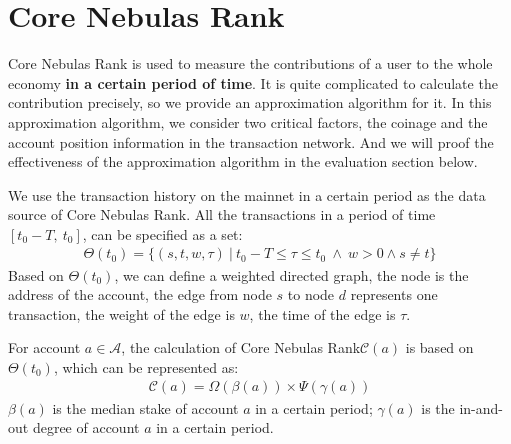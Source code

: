\section{Core Nebulas Rank}

Core Nebulas Rank is used to measure the contributions of a user to the whole economy {\textbf{in a certain period of time}}.
It is quite complicated to calculate the contribution precisely, so we provide an approximation algorithm for it.
In this approximation algorithm, we consider two critical factors, the coinage and the account position information in the transaction network. And we will proof the effectiveness of the approximation algorithm in the evaluation section below.

We use the transaction history on the mainnet in a certain period as the data source of Core Nebulas Rank.
All the transactions in a period of time $[t_0-T,\ t_0]$, can be specified as a set:
\begin{align}
\Theta(t_0) = \{(s, t, w, \tau)\ |\ t_0 - T \le \tau \le t_0\ \land \ w > 0 \land s \neq t \}
\end{align}
\noindent Based on $\Theta(t_0)$, we can define a weighted directed graph, the node is the address of the account, the edge from node $s$ to node $d$ represents one transaction,
the weight of the edge is $w$, the time of the edge is $\tau$.

For account $a \in \mathcal{A}$, the calculation of Core Nebulas Rank$\mathcal{C}(a)$ is based on $\Theta(t_0)$, which can be represented as:
\begin{align}
\mathcal{C}(a) = \Omega(\beta(a)) \times{} \Psi(\gamma(a))
\label{eq:rank}
\end{align}
\noindent $\beta(a)$ is the median stake of account $a$ in a certain period; $\gamma(a)$ is the in-and-out degree of account $a$ in a certain period.


